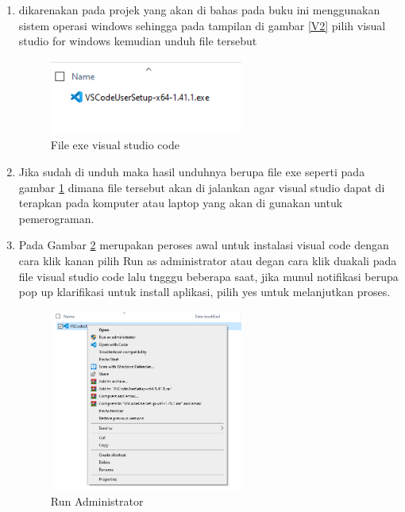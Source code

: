 \begin{enumerate}
\item dikarenakan pada projek yang akan di bahas pada buku ini menggunakan sistem operasi windows sehingga pada tampilan di gambar \ref{V2} pilih visual studio for windows kemudian unduh file tersebut\par 

\begin{figure}[!htbp]
	\centerline{\includegraphics[width=0.6\textwidth]{figures/vs/3.png}}
	\caption{File exe visual studio code}
	\label{V3}
\end{figure}

\item Jika sudah di unduh maka hasil unduhnya berupa file exe seperti pada gambar \ref{V3} dimana file tersebut akan di jalankan agar visual studio dapat di terapkan pada komputer atau laptop yang akan di gunakan untuk pemerograman.\par

\item Pada Gambar \ref{V4} merupakan peroses awal untuk instalasi visual code dengan cara klik kanan pilih Run as administrator atau degan cara klik duakali pada file visual studio code lalu tngggu beberapa saat, jika munul notifikasi berupa pop up klarifikasi untuk install aplikasi, pilih yes untuk melanjutkan proses.\par \pagebreak
\begin{figure}[!htbp]
	\centerline{\includegraphics[width=0.6\textwidth]{figures/vs/4.png}}
	\caption{Run Administrator}
	\label{V4}
\end{figure}


\end{enumerate}
